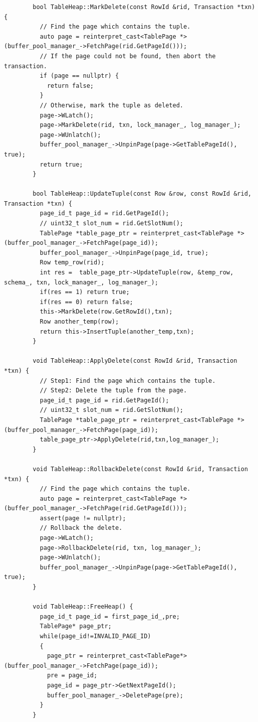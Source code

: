 \documentclass{article}
\begin{document}
\begin{appendices}
\begin{lstlisting}
        bool TableHeap::MarkDelete(const RowId &rid, Transaction *txn) {
          // Find the page which contains the tuple.
          auto page = reinterpret_cast<TablePage *>(buffer_pool_manager_->FetchPage(rid.GetPageId()));
          // If the page could not be found, then abort the transaction.
          if (page == nullptr) {
            return false;
          }
          // Otherwise, mark the tuple as deleted.
          page->WLatch();
          page->MarkDelete(rid, txn, lock_manager_, log_manager_);
          page->WUnlatch();
          buffer_pool_manager_->UnpinPage(page->GetTablePageId(), true);
          return true;
        }
        
        bool TableHeap::UpdateTuple(const Row &row, const RowId &rid, Transaction *txn) {
          page_id_t page_id = rid.GetPageId();
          // uint32_t slot_num = rid.GetSlotNum();
          TablePage *table_page_ptr = reinterpret_cast<TablePage *>(buffer_pool_manager_->FetchPage(page_id));
          buffer_pool_manager_->UnpinPage(page_id, true);
          Row temp_row(rid);
          int res =  table_page_ptr->UpdateTuple(row, &temp_row, schema_, txn, lock_manager_, log_manager_);
          if(res == 1) return true;
          if(res == 0) return false;
          this->MarkDelete(row.GetRowId(),txn);
          Row another_temp(row);
          return this->InsertTuple(another_temp,txn);
        }
        
        void TableHeap::ApplyDelete(const RowId &rid, Transaction *txn) {
          // Step1: Find the page which contains the tuple.
          // Step2: Delete the tuple from the page.
          page_id_t page_id = rid.GetPageId();
          // uint32_t slot_num = rid.GetSlotNum();
          TablePage *table_page_ptr = reinterpret_cast<TablePage *>(buffer_pool_manager_->FetchPage(page_id));
          table_page_ptr->ApplyDelete(rid,txn,log_manager_);
        }
        
        void TableHeap::RollbackDelete(const RowId &rid, Transaction *txn) {
          // Find the page which contains the tuple.
          auto page = reinterpret_cast<TablePage *>(buffer_pool_manager_->FetchPage(rid.GetPageId()));
          assert(page != nullptr);
          // Rollback the delete.
          page->WLatch();
          page->RollbackDelete(rid, txn, log_manager_);
          page->WUnlatch();
          buffer_pool_manager_->UnpinPage(page->GetTablePageId(), true);
        }
        
        void TableHeap::FreeHeap() {
          page_id_t page_id = first_page_id_,pre;
          TablePage* page_ptr; 
          while(page_id!=INVALID_PAGE_ID)
          {
            page_ptr = reinterpret_cast<TablePage*>(buffer_pool_manager_->FetchPage(page_id));
            pre = page_id;
            page_id = page_ptr->GetNextPageId();
            buffer_pool_manager_->DeletePage(pre);
          }
        }
        

\end{lstlisting}
\end{appendices}
\end{document}
